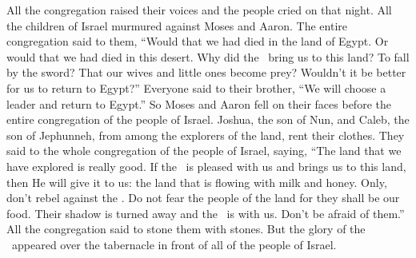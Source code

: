 
\begin{inparaenum}
   All the congregation raised their voices and the people cried on that night.%
   All the children of Israel murmured against Moses and Aaron. The entire congregation said to them, ``Would that we had died in the land of Egypt. Or would that we had died in this desert.%
   Why did the \lord\ bring us to this land? To fall by the sword? That our wives and little ones become prey? Wouldn't it be better for us to return to Egypt?''%
   Everyone said to their brother, ``We will choose a leader and return to Egypt.''%
   So Moses and Aaron fell on their faces before the entire congregation of the people of Israel.%
   Joshua, the son of Nun, and Caleb, the son of Jephunneh, from among the explorers of the land, rent their clothes.%
   They said to the whole congregation of the people of Israel, saying, ``The land that we have explored is really good.%
   If the \lord\ is pleased with us and brings us to this land, then He will give it to us: the land that is flowing with milk and honey.%
   Only, don't rebel against the \lord. Do not fear the people of the land for they shall be our food. Their shadow is turned away and the \lord\ is with us. Don't be afraid of them.''%
   All the congregation said to stone them with stones. But the glory of the \lord\ appeared over the tabernacle in front of all of the people of Israel.%


\end{inparaenum}
